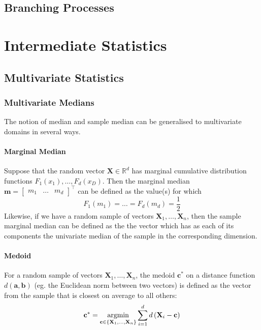 \documentclass[11pt]{report} %
\begin{document}
\section{Branching Processes}

\chapter{Intermediate Statistics}

\section{Multivariate Statistics}

\subsection{Multivariate Medians}

The notion of median and sample median can be generalised to multivariate domains in several ways.

\subsubsection{Marginal Median}

Suppose that the random vector $\mathbf{X} \in \mathbb{R}^{d}$ has marginal cumulative distribution functions $F_{1}\left(x_{1}\right), \dots, F_{d}\left(x_{D}\right)$. Then the marginal median $\mathbf{m} = \begin{bmatrix} m_{1} & \dots & m_{d}\end{bmatrix}^{\top}$ can be defined as the value(s) for which
\begin{equation}
F_{1}\left(m_{1}\right) = \dots = F_{d}\left(m_{d}\right) = \dfrac{1}{2}
\end{equation}
Likewise, if we have a random sample of vectors $\mathbf{X}_{1}, \dots, \mathbf{X}_{n}$, then the sample marginal median can be defined as the the vector which has as each of its components the univariate median of the sample in the corresponding dimension.

\subsubsection{Medoid}

For a random sample of vectors $\mathbf{X}_{1}, \dots, \mathbf{X}_{n}$, the medoid $\mathbf{c}^{*}$ on a distance function $d\left(\mathbf{a}, \mathbf{b}\right)$ (eg. the Euclidean norm between two vectors) is defined as the vector from the sample that is closest on average to all others:
\begin{equation}
\mathbf{c}^{*} = \operatorname*{argmin}_{\mathbf{c} \in \left\{\mathbf{X}_{1}, \dots, \mathbf{X}_{n}\right\}}\sum_{i = 1}^{d}d\left(\mathbf{X}_{i} - \mathbf{c}\right)
\end{equation}
\end{document}
